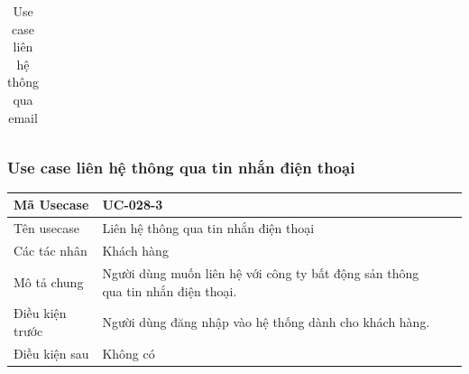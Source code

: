 \documentclass[12pt,a4paper]{article}
\begin{document}
\begin{table}[H]
\begin{tabular}{|p{3.5cm}|p{11.5cm}|c|}
            \\ \hline
        \end{tabular}
        \caption{Use case liên hệ thông qua email}

    \end{table}



    \subsubsection*{Use case liên hệ thông qua tin nhắn điện thoại}
    \begin{table}[H]
        \centering
        \begin{tabular}{|p{3.5cm}|p{11.5cm}|c|}
            \hline
            Mã Usecase      & UC-028-3                                                                        \\
            \hline
            Tên usecase     & Liên hệ thông qua tin nhắn điện thoại                                           \\
            \hline
            Các tác nhân    & Khách hàng                                                                      \\
            \hline
            Mô tả chung     & Người dùng muốn liên hệ với công ty bất động sản thông qua tin nhắn điện thoại. \\
            \hline

            Điều kiện trước & Người dùng đăng nhập vào hệ thống dành cho khách hàng.                          \\
            \hline

            Điều kiện sau   & Không có                                                                        \\
            \hline


\end{tabular}
\end{table}
\end{document}
